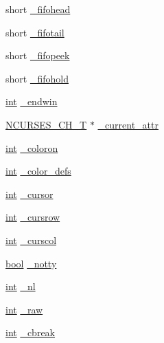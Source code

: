 \begin{DoxyCompactItemize}
\item 
short \hyperlink{structscreen_afcb025c47ae5562c93230f58e695eec8}{\-\_\-fifohead}
\item 
short \hyperlink{structscreen_a21cbafc2f83fedc19c1026f91cd3ccb8}{\-\_\-fifotail}
\item 
short \hyperlink{structscreen_a5567e471071d376926b712fec28ee86c}{\-\_\-fifopeek}
\item 
short \hyperlink{structscreen_ab488d2983dd63c44bad96f40b927d3f6}{\-\_\-fifohold}
\item 
\hyperlink{term__entry_8h_ad65b480f8c8270356b45a9890f6499ae}{int} \hyperlink{structscreen_a3a9cfc64e129ad5729789290f73584e8}{\-\_\-endwin}
\item 
\hyperlink{curses_8priv_8h_a04df53f09b2555aa1f2cee78235c33cd}{N\-C\-U\-R\-S\-E\-S\-\_\-\-C\-H\-\_\-\-T} $\ast$ \hyperlink{structscreen_ac8bba49772e912af627be1064eac50a6}{\-\_\-current\-\_\-attr}
\item 
\hyperlink{term__entry_8h_ad65b480f8c8270356b45a9890f6499ae}{int} \hyperlink{structscreen_a0d9328b760aa3ec1848a5839b81c805c}{\-\_\-coloron}
\item 
\hyperlink{term__entry_8h_ad65b480f8c8270356b45a9890f6499ae}{int} \hyperlink{structscreen_af3925034bc756323d22145534d1a1a03}{\-\_\-color\-\_\-defs}
\item 
\hyperlink{term__entry_8h_ad65b480f8c8270356b45a9890f6499ae}{int} \hyperlink{structscreen_ab27c918a2eb6523ff1f73b5b9477a90f}{\-\_\-cursor}
\item 
\hyperlink{term__entry_8h_ad65b480f8c8270356b45a9890f6499ae}{int} \hyperlink{structscreen_ad4e9c06403ae549f600e37d0689135a0}{\-\_\-cursrow}
\item 
\hyperlink{term__entry_8h_ad65b480f8c8270356b45a9890f6499ae}{int} \hyperlink{structscreen_ab77752b181526e9d9afe948ae5fc3c37}{\-\_\-curscol}
\item 
\hyperlink{term__entry_8h_a002004ba5d663f149f6c38064926abac}{bool} \hyperlink{structscreen_af64cd783110a274e9ed7edcaf0b52f60}{\-\_\-notty}
\item 
\hyperlink{term__entry_8h_ad65b480f8c8270356b45a9890f6499ae}{int} \hyperlink{structscreen_a2bf5615f0feba9d56e78e470697b25df}{\-\_\-nl}
\item 
\hyperlink{term__entry_8h_ad65b480f8c8270356b45a9890f6499ae}{int} \hyperlink{structscreen_ac1b4b6953c2df7c388af4672449a03fd}{\-\_\-raw}
\item 
\hyperlink{term__entry_8h_ad65b480f8c8270356b45a9890f6499ae}{int} \hyperlink{structscreen_abebbf63cf8e003136ed94153cdb1124b}{\-\_\-cbreak}

\end{DoxyCompactItemize}
